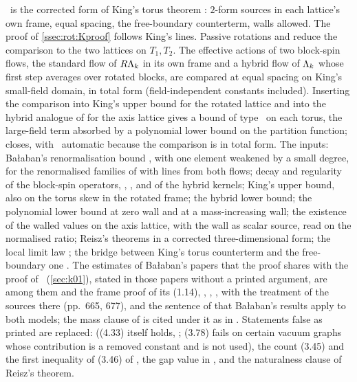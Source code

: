 \begin{remark}\label{rot:rem:behindK}
\Kz\ is the corrected form of King's torus theorem \cite[Thm.~2.4]{K2}: $2$-form sources in each lattice's own frame, equal spacing, the free-boundary counterterm, walls allowed. The proof of \cref{ssec:rot:Kproof} follows King's lines. Passive rotations and  reduce the comparison to the two lattices on $T_1,T_2$. The effective actions of two block-spin flows, the standard flow of $R\Lambda_k$ in its own frame and a hybrid flow of $\Lambda_k$ whose first step averages over rotated blocks, are compared at equal spacing on King's small-field domain, in total form (field-independent constants included). Inserting the comparison into King's upper bound \cite[Thm.~3.1]{K1} for the rotated lattice and into the hybrid analogue of \cite[Prop.~4.1]{K2} for the axis lattice gives a bound of type \hypF\ on each torus, the large-field term absorbed by a polynomial lower bound on the partition function;  closes, with \hypV\ automatic because the comparison is in total form. The inputs: Ba{\l}aban's renormalisation bound \cite[Prop.~1]{Ba3}, with one element weakened by a small degree, for the renormalised families of \cite[\S3.5]{K1} with lines from both flows; decay and regularity of the block-spin operators, \cite[Thm.~3.3]{K1}, \cite{Ba4}, and of the hybrid kernels; King's upper bound, also on the torus skew in the rotated frame; the hybrid lower bound; the polynomial lower bound \cite[(1.14)]{Ba1} at zero wall and at a mass-increasing wall; the existence of the walled values on the axis lattice, \cite[Thm.~2.1]{K1} with the wall as scalar source, read on the normalised ratio; Reisz's theorems \cite{Rei88,Rei88b} in a corrected three-dimensional form; the local limit law \cite{LL10}; the bridge between King's torus counterterm \cite[(3.33)]{K1} and the free-boundary one \cite[p.~330]{K2}. The estimates of Ba{\l}aban's papers that the proof shares with the proof of \EC\ (\cref{sec:k01}), stated in those papers without a printed argument, are among them \cite[(2.33), (2.39)--(2.42), (3.20)--(3.21), (3.25), (3.34)--(3.36)]{Ba1} and the frame proof of its (1.14), \cite[Prop.~2.6, Lemma~2.7, (3.5), (3.7)--(3.8)]{Ba2}, \cite[Prop.~1 with (1.33)]{Ba3}, \cite[Lemma~2.4, (1.8), (1.15), (1.16), (1.20)]{Ba4}, \cite[Thm.~3.1, Props.~3.6--3.9, Lemma~4.5]{K1} with the treatment of the sources there (pp.~665, 677), and the sentence of \cite{K2} that Ba{\l}aban's results apply to both models; the mass clause of \cite[Prop.~3.1]{Ba2} is cited under it as in . Statements false as printed are replaced: \cite[Thm.~3.5(i), (4.21), (4.36)--(4.37)]{K1} ((4.33) itself holds, ; (3.78) fails on certain vacuum graphs whose contribution is a removed constant and is not used), the count (3.45) and the first inequality of (3.46) of \cite{Ba2}, the gap value in \cite[(2.27)]{Ba4}, and the naturalness clause of Reisz's theorem.
\end{remark}

